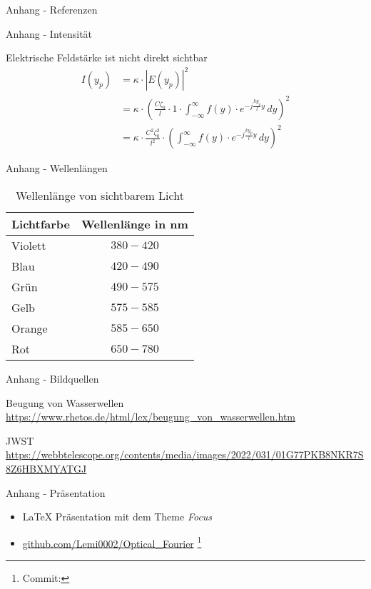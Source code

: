 \appendix

\begin{frame}{Anhang - Referenzen}
    \nocite{*} %
    
    
\end{frame}

\begin{frame}{Anhang - Intensität}
    \begin{block}{Elektrische Feldstärke ist nicht direkt sichtbar}
        \begin{align*}
            I(y_p)
            &=
            \kappa \cdot |E(y_p)|^2
            \\
            &=
            \kappa \cdot \left(\frac{C\zeta_0}{l} \cdot 1 \cdot \int_{-\infty}^{\infty}f(y)\cdot e^{-j\frac{ky_p}{l}y} \,dy\right)^2
            \\
            &=
            \kappa \cdot \frac{C^2\zeta_0^2}{l^2}\cdot \left(\int_{-\infty}^{\infty}f(y)\cdot e^{-j\frac{ky_p}{l}y} \,dy\right)^2
        \end{align*}        
    \end{block}
\end{frame}

\begin{frame}{Anhang - Wellenlängen}
    \begin{table}
        \centering %
        \begin{tabular}{l c}
            \toprule
            Lichtfarbe & Wellenlänge in nm \\
            \toprule
            Violett    & $380 - 420$       \\
            Blau       & $420 - 490$       \\
            Grün       & $490 - 575$       \\
            Gelb       & $575 - 585$       \\
            Orange     & $585 - 650$       \\
            Rot        & $650 - 780$       \\
            \bottomrule
        \end{tabular}
        \caption{Wellenlänge von sichtbarem Licht}
    \end{table}
\end{frame}

\begin{frame}{Anhang - Bildquellen}
    \begin{block}{Beugung von Wasserwellen}
        \url{https://www.rhetos.de/html/lex/beugung_von_wasserwellen.htm}
    \end{block}

    \begin{block}{JWST}
        \url{https://webbtelescope.org/contents/media/images/2022/031/01G77PKB8NKR7S8Z6HBXMYATGJ}
    \end{block}
\end{frame}

\begin{frame}{Anhang - Präsentation}
    \begin{itemize}
        \item \LaTeX{} Präsentation mit dem Theme \emph{Focus}
        \item \url{github.com/Lemi0002/Optical_Fourier} \footnote{Commit: }
    \end{itemize}
\end{frame}
